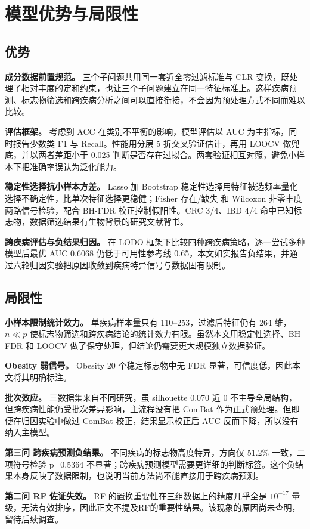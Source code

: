 \section{模型优势与局限性}
\label{sec:strengths}

\subsection{优势}

\textbf{成分数据前置规范。} 三个子问题共用同一套近全零过滤标准与 CLR 变换，既处理了相对丰度的定和约束，也让三个子问题建立在同一特征标准上。这样疾病预测、标志物筛选和跨疾病分析之间可以直接衔接，不会因为预处理方式不同而难以比较。

\textbf{评估框架。} 考虑到 ACC 在类别不平衡的影响，模型评估以 AUC 为主指标，同时报告少数类 F1 与 Recall。性能用分层 5 折交叉验证估计，再用 LOOCV 做兜底，并以两者差距小于 0.025 判断是否存在过拟合。两套验证相互对照，避免小样本下把准确率误认为泛化能力。

\textbf{稳定性选择抗小样本方差。} Lasso 加 Bootstrap 稳定性选择用特征被选频率量化选择不确定性，比单次特征选择更稳健；Fisher 存在/缺失 和 Wilcoxon 非零丰度两路信号检验，配合 BH-FDR 校正控制假阳性。CRC 3/4、IBD 4/4 命中已知标志物，数据筛选结果有生物背景的研究文献背书。

\textbf{跨疾病评估与负结果归因。} 在 LODO 框架下比较四种跨疾病策略，逐一尝试多种模型后最优 AUC 0.6068 仍低于可用性参考线 0.65，本文如实报告负结果，并通过六轮归因实验把原因收敛到疾病特异信号与数据固有限制。

\subsection{局限性}

\textbf{小样本限制统计效力。} 单疾病样本量只有 110–253，过滤后特征仍有 264 维，$n\ll p$ 使标志物筛选和跨疾病结论的统计效力有限。虽然本文用稳定性选择、BH-FDR 和 LOOCV 做了保守处理，但结论仍需要更大规模独立数据验证。

\textbf{Obesity 弱信号。} Obesity 20 个稳定标志物中无 FDR 显著，可信度低，因此本文将其明确标注。

\textbf{批次效应。} 三数据集来自不同研究，虽 silhouette 0.070 近 0 不主导全局结构，但跨疾病性能仍受批次差异影响，主流程没有把 ComBat 作为正式预处理。但即便在归因实验中做过 ComBat 校正，结果显示校正后 AUC 反而下降，所以没有纳入主模型。

\textbf{第三问 跨疾病预测负结果。} 不同疾病的标志物高度特异，方向仅 51.2\% 一致，二项符号检验 p=0.5364 不显著；跨疾病预测模型需要更详细的判断标签。这个负结果本身反映了数据限制，也说明当前方法尚不能直接用于跨疾病预测。

\textbf{第二问 RF 佐证失效。} RF 的置换重要性在三组数据上的精度几乎全是 $10^{-17}$ 量级，无法有效排序，因此正文不提及RF的重要性结果。该现象的原因尚未查明，留待后续调查。
